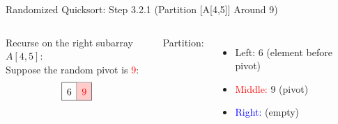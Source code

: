 \begin{frame}{Randomized Quicksort: Step 3.2.1 (Partition [A[4,5]] Around 9)}
  \begin{columns}[t]
    Recurse on the right subarray $A[4,5]$:
    \\[0.5em]

    Suppose the random pivot is \textcolor{red}{9}:
    \[
      \renewcommand{\arraystretch}{1.5}
      \begin{array}{|c|c|}
        \hline
        6 & \cellcolor{red!20}\textcolor{red}{9} \\
        \hline
      \end{array}
    \]

    Partition:
    \begin{itemize}
      \item \textcolor{green!60!black}{Left:} 6 (element before pivot)
      \item \textcolor{red}{Middle:} 9 (pivot)
      \item \textcolor{blue}{Right:} (empty)
    \end{itemize}

    \begin{minipage}[t]{\linewidth}
      \vspace{0pt} %
      \begin{center}


\end{center}
\end{minipage}
\end{columns}
\end{frame}
